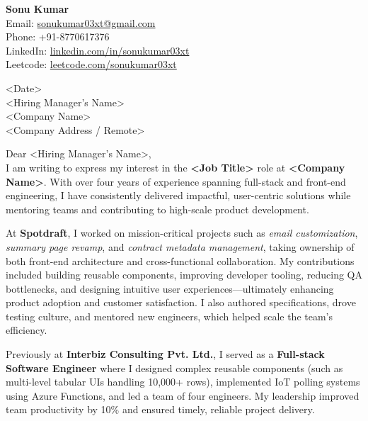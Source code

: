 \documentclass[11pt,a4paper]{article}
\newcommand{\JobTitle}{<Job Title>}
\newcommand{\Company}{<Company Name>}
\newcommand{\Manager}{<Hiring Manager's Name>}
\newcommand{\LetterDate}{<Date>}
\newcommand{\CompanyAddr}{<Company Address / Remote>}
\begin{document}
\begin{flushright}
\textbf{Sonu Kumar} \\
Email: \href{mailto:sonukumar03xt@gmail.com}{sonukumar03xt@gmail.com} \\
Phone: +91-8770617376 \\
LinkedIn: \href{https://www.linkedin.com/in/sonukumar03xt/}{linkedin.com/in/sonukumar03xt} \\
Leetcode: \href{https://leetcode.com/sonukumar03xt/}{leetcode.com/sonukumar03xt} \\
\end{flushright}

\vspace{1cm}

\noindent \LetterDate \\
\Manager \\
\Company \\
\CompanyAddr \\

\vspace{0.5cm}

\noindent Dear \Manager, \\

I am writing to express my interest in the \textbf{\JobTitle} role at \textbf{\Company}. With over four years of experience spanning full-stack and front-end engineering, I have consistently delivered impactful, user-centric solutions while mentoring teams and contributing to high-scale product development.  

At \textbf{Spotdraft}, I worked on mission-critical projects such as \emph{email customization}, \emph{summary page revamp}, and \emph{contract metadata management}, taking ownership of both front-end architecture and cross-functional collaboration. My contributions included building reusable components, improving developer tooling, reducing QA bottlenecks, and designing intuitive user experiences—ultimately enhancing product adoption and customer satisfaction. I also authored specifications, drove testing culture, and mentored new engineers, which helped scale the team’s efficiency.  

Previously at \textbf{Interbiz Consulting Pvt. Ltd.}, I served as a \textbf{Full-stack Software Engineer} where I designed complex reusable components (such as multi-level tabular UIs handling 10,000+ rows), implemented IoT polling systems using Azure Functions, and led a team of four engineers. My leadership improved team productivity by 10\% and ensured timely, reliable project delivery.  
\end{document}
